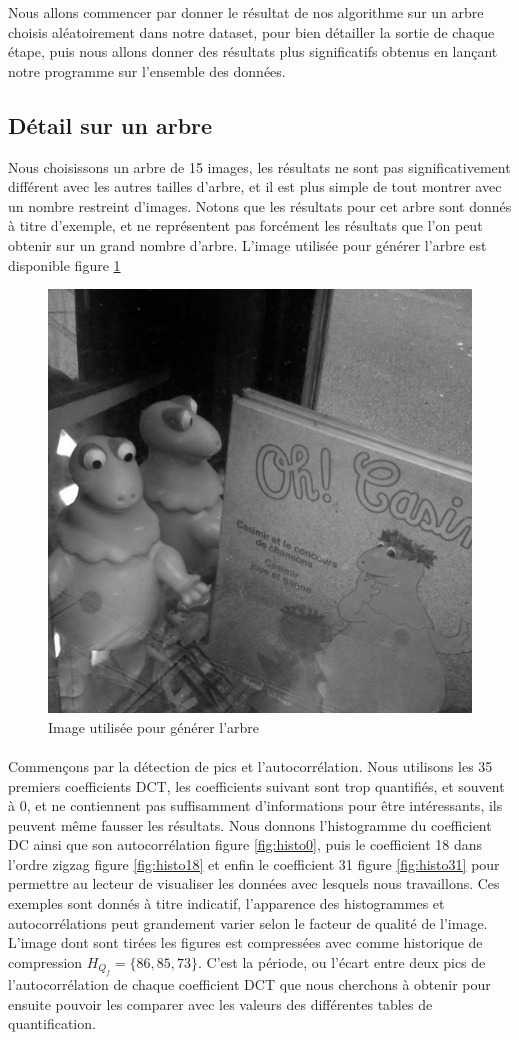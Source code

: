 \documentclass[utf8,final]{stageM2R} %
\begin{document}
Nous allons commencer par donner le résultat de nos algorithme sur un arbre choisis aléatoirement dans notre dataset, pour bien détailler la sortie de chaque étape, puis nous allons donner des résultats plus significatifs obtenus en lançant notre programme sur l'ensemble des données.

\subsection{Détail sur un arbre}
Nous choisissons un arbre de 15 images, les résultats ne sont pas significativement différent avec les autres tailles d'arbre, et il est plus simple de tout montrer avec un nombre restreint d'images. Notons que les résultats pour cet arbre sont donnés à titre d'exemple, et ne représentent pas forcément les résultats que l'on peut obtenir sur un grand nombre d'arbre. L'image utilisée pour générer l'arbre est disponible figure \ref{casimir}

\begin{figure}
\centering
\includegraphics[width=0.5\linewidth]{images/casimir}
\caption{Image utilisée pour générer l'arbre}
\label{casimir}
\end{figure}

\paragraph{}
Commençons par la détection de pics et l'autocorrélation. Nous utilisons les 35 premiers coefficients DCT, les coefficients suivant sont trop quantifiés, et souvent à 0, et ne contiennent pas suffisamment d'informations pour être intéressants, ils peuvent même fausser les résultats. Nous donnons l'histogramme du coefficient DC ainsi que son autocorrélation figure \ref{fig:histo0}, puis le coefficient 18 dans l'ordre zigzag figure \ref{fig:histo18} et enfin le coefficient 31 figure \ref{fig:histo31} pour permettre au lecteur de visualiser les données avec lesquels nous travaillons. Ces exemples sont donnés à titre indicatif, l'apparence des histogrammes et autocorrélations peut grandement varier selon le facteur de qualité de l'image. L'image dont sont tirées les figures est compressées avec comme historique de compression $H_{Q_{f}} = \{86, 85, 73\}$. C'est la période, ou l'écart entre deux pics de l'autocorrélation de chaque coefficient DCT que nous cherchons à obtenir pour ensuite pouvoir les comparer avec les valeurs des différentes tables de quantification.
\end{document}
